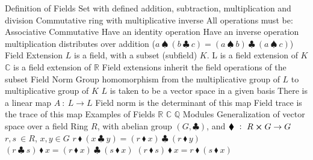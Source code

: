 \documentclass[14pt]{extarticle}
\begin{document}
\begin{outline}
	\1	Definition of Fields
		\2	Set with defined addition, subtraction, multiplication and division
			\3	Commutative ring with multiplicative inverse
			\3	All operations must be:
				\4	Associative
				\4	Commutative
				\4	Have an identity operation
				\4	Have an inverse operation
				\4	multiplication distributes over addition ($a~\spadesuit~(b~\clubsuit~c) = (a~\spadesuit~b)~\clubsuit~ (a~\spadesuit~c)$) 
		\2	Field Extension
			\3	$L$ is a field, with a subset (subfield) $K$.  L is a field extension of $K$
			\3	$\mathbb{C}$ is a field extension of $\mathbb{R}$
			\3	Field extensions inherit the field operations of the subset
		\2	Field Norm
			\3	Group homomorphism from the multiplicative group of $L$ to multiplicative group of $K$
			\3	$L$ is taken to be a vector space in a given basis
			\3	There is a linear map $A~:~L \rightarrow L$ 
			\3	Field norm is the determinant of this map
			\3	Field trace is the trace of this map		
	\1	Examples of Fields
		\2	$\mathbb{R}$ 
		\2	$\mathbb{C}$ 
		\2	$\mathbb{Q}$ 
	\1	Modules 
		\2	Generalization of vector space over a field
		\2	Ring $R$, with abelian group $(G,\clubsuit)$, and $\blacklozenge~:~R\cross G \rightarrow G$
			\3	$r,s~\in R$, $x,y \in G$
			\3	$r~\blacklozenge~(x~\clubsuit~ y) = (r~\blacklozenge~x)~\clubsuit~(r~\blacklozenge~ y)$
			\3	$(r ~\clubsuit~ s)~\blacklozenge~x = (r~\blacklozenge~x)~\clubsuit~ (s~\blacklozenge~x)$
			\3	$(r~\blacklozenge~s)~\blacklozenge~x = r~\blacklozenge~(s~\blacklozenge~x)$

	\end{outline}
\end{document}
